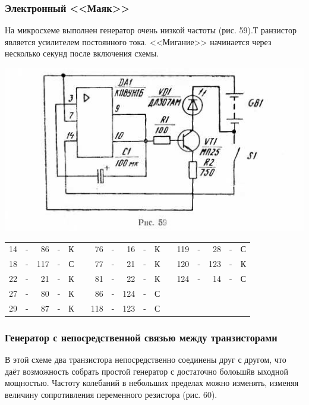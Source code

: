\documentclass[12pt]{article}
\begin{document}
\hrulefill

\subsubsection{Электронный <<Маяк>>}

На микросхеме выполнен генератор очень низкой частоты (рис. 59).Т ранзистор является усилителем постоянного тока. <<Мигание>> начинается через несколько секунд после включения схемы.


\includegraphics[scale=0.9, angle=0]{ekon3_059_1}

\hrulefill

\begin{tabular}{r c r c r p{2cm} r c r c r p{2cm} r c r c r}
 14 & - &  86 & - & К &     &  76 & - &  16 & - & К &    & 119 & - &  28 & - & С\\
 18 & - & 117 & - & С &     &  77 & - &  21 & - & К &    & 120 & - & 123 & - & К\\
 22 & - &  21 & - & К &     &  81 & - &  22 & - & К &    & 124 & - &  14 & - & С\\
 27 & - &  80 & - & К &     &  86 & - & 124 & - & С &    &     &   &     &   &  \\
 29 & - &  87 & - & К &     & 118 & - & 123 & - & С &    &     &   &     &   &  \\
\end{tabular}

\hrulefill

\newpage

\subsubsection{ Генератор с непосредственной связью между транзисторами}

В этой схеме два транзистора непосредственно соединены друг с другом, что даёт возможность собрать простой генератор с достаточно болоьшйв ыходной мощностью. Частоту  колебаний в небольших пределах можно изменять, изменяя величину сопротивления переменного резистора (рис. 60).
\end{document}
